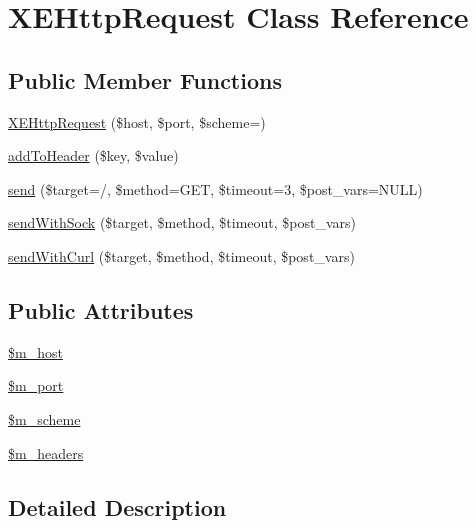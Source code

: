 \hypertarget{classXEHttpRequest}{}\section{X\+E\+Http\+Request Class Reference}
\label{classXEHttpRequest}
\subsection*{Public Member Functions}
\begin{DoxyCompactItemize}
\item 
\hyperlink{classXEHttpRequest_aa8a672ad4e5c3cc8d3b7a9cecc29d349}{X\+E\+Http\+Request} (\$host, \$port, \$scheme=\textquotesingle{}\textquotesingle{})
\item 
\hyperlink{classXEHttpRequest_af936bdc66e6dcabbd8934afc5e210063}{add\+To\+Header} (\$key, \$value)
\item 
\hyperlink{classXEHttpRequest_a2da452edb62d7182bf4547f8214c10b5}{send} (\$target=\textquotesingle{}/\textquotesingle{}, \$method=\textquotesingle{}G\+ET\textquotesingle{}, \$timeout=3, \$post\+\_\+vars=N\+U\+LL)
\item 
\hyperlink{classXEHttpRequest_a9e316ec4c68dfe9a124327287dae2754}{send\+With\+Sock} (\$target, \$method, \$timeout, \$post\+\_\+vars)
\item 
\hyperlink{classXEHttpRequest_ae6412b6f079b88a67f43602d3cdae2d7}{send\+With\+Curl} (\$target, \$method, \$timeout, \$post\+\_\+vars)
\end{DoxyCompactItemize}
\subsection*{Public Attributes}
\begin{DoxyCompactItemize}
\item 
\hyperlink{classXEHttpRequest_ad88148dced2b42017a96b2a5dd0b533a}{\$m\+\_\+host}
\item 
\hyperlink{classXEHttpRequest_a35c62f61b5ad2c200c53a58dd43a2784}{\$m\+\_\+port}
\item 
\hyperlink{classXEHttpRequest_a501919f00934ef2cc76300fa32c2f19d}{\$m\+\_\+scheme}
\item 
\hyperlink{classXEHttpRequest_a36df236b46af2f09dd9020096dbaed22}{\$m\+\_\+headers}
\end{DoxyCompactItemize}


\subsection{Detailed Description}



